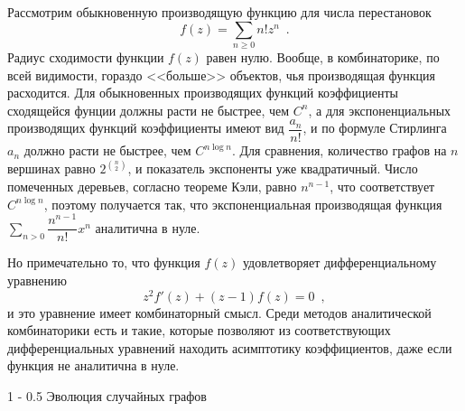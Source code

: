 \documentclass[a5paper]{article}
\makeatletter
\theoremstyle{definition}
\renewcommand{\subsection}{\@startsection
{subsection}%
{1}%
{\z@}%
{-\baselineskip}%
{0.5\baselineskip}%
{\centering\large\scshape}} %
\makeatother
\begin{document}
Рассмотрим обыкновенную производящую функцию для числа перестановок
\[
	f(z) = \sum_{n \geq 0} n! z^n \enspace .
\]
Радиус сходимости функции \( f(z) \) равен нулю. Вообще, в комбинаторике, по 
всей видимости, гораздо <<больше>> объектов, чья производящая функция 
расходится. Для обыкновенных производящих функций коэффициенты сходящейся 
фунции должны расти не быстрее, чем \( C^{n} \), а для экспоненциальных 
производящих функций коэффициенты имеют вид \( \dfrac{a_n}{n!} \), и по формуле 
Стирлинга \( a_n \) должно расти не быстрее, чем \( C^{n \log n} \). Для 
сравнения, количество графов на \( n \) вершинах равно \( 2^{{n \choose 2}} \), 
и показатель экспоненты уже квадратичный. Число помеченных деревьев, согласно 
теореме Кэли, равно \( n^{n-1} \), что соответствует \( C^{n \log n} \), 
поэтому получается так, что экспоненциальная производящая функция \( \sum_{n > 
0} \dfrac{n^{n-1}}{n!} x^n \) аналитична в нуле.

Но примечательно то, что функция \( f(z) \) удовлетворяет дифференциальному 
уравнению
\[
	z^2 f'(z) + (z-1) f(z) = 0 \enspace ,
\]
и это уравнение имеет комбинаторный смысл. Среди методов аналитической 
комбинаторики есть и такие, которые позволяют из соответствующих 
дифференциальных уравнений находить асимптотику коэффициентов, даже если 
функция не аналитична в нуле.

\subsection{Эволюция случайных графов}
\end{document}
